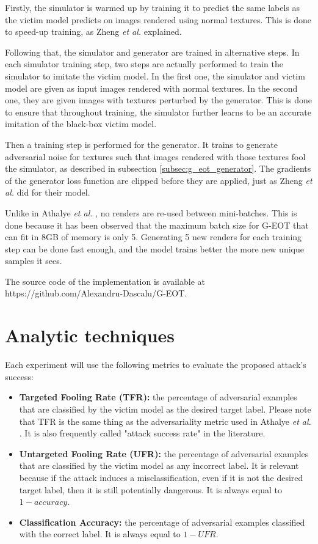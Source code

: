 Firstly, the simulator is warmed up by training it to predict the same labels as the victim model predicts on images rendered using normal textures. This is done to speed-up training, as Zheng \textit{et al.} \cite{zheng_black_box_GAN} explained.

Following that, the simulator and generator are trained in alternative steps. In each simulator training step, two steps are actually performed to train the simulator to imitate the victim model. In the first one, the simulator and victim model are given as input images rendered with normal textures. In the second one, they are given images with textures perturbed by the generator. This is done to ensure that throughout training, the simulator further learns to be an accurate imitation of the black-box victim model.

Then a training step is performed for the generator. It trains to generate adversarial noise for textures such that images rendered with those textures fool the simulator, as described in subsection \ref{subsec:g_eot_generator}. The gradients of the generator loss function are clipped before they are applied, just as Zheng \textit{et al.} \cite{zheng_black_box_GAN} did for their model.

Unlike in Athalye \textit{et al.} \cite{athalye}, no renders are re-used between mini-batches. This is done because it has been observed that the maximum batch size for G-EOT that can fit in 8GB of memory is only 5. Generating 5 new renders for each training step can be done fast enough, and the model trains better the more new unique samples it sees.

The source code of the implementation is available at https://github.com/Alexandru-Dascalu/G-EOT.

\section{Analytic techniques}
    \label{sec:analytic_techniques}
    
Each experiment will use the following metrics to evaluate the proposed attack's success:

\begin{itemize}
    \item \textbf{Targeted Fooling Rate (TFR):} the percentage of adversarial examples that are classified by the victim model as the desired target label. Please note that TFR is the same thing as the adversariality metric used in Athalye \textit{et al.} \cite{athalye}. It is also frequently called "attack success rate" in the literature.
    \item \textbf{Untargeted Fooling Rate (UFR):} the percentage of adversarial examples that are classified by the victim model as any incorrect label. It is relevant because if the attack induces a misclassification, even if it is not the desired target label, then it is still potentially dangerous.  It is always equal to $1 - accuracy$.
    \item \textbf{Classification Accuracy:} the percentage of adversarial examples classified with the correct label. It is always equal to $1 - UFR$.
\end{itemize}
